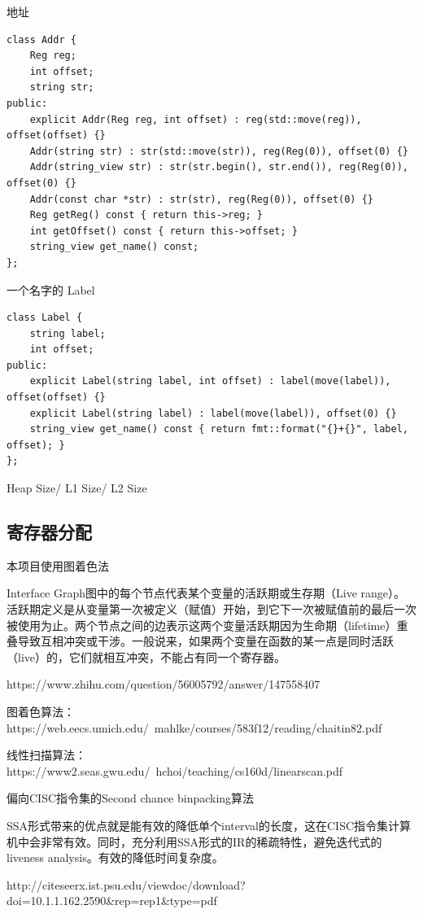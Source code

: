 \documentclass[a4paper]{exam}
\theoremstyle{definition}
\begin{document}
地址
\begin{verbatim}
class Addr {
    Reg reg;
    int offset;
    string str;
public:
    explicit Addr(Reg reg, int offset) : reg(std::move(reg)), offset(offset) {}
    Addr(string str) : str(std::move(str)), reg(Reg(0)), offset(0) {}
    Addr(string_view str) : str(str.begin(), str.end()), reg(Reg(0)), offset(0) {}
    Addr(const char *str) : str(str), reg(Reg(0)), offset(0) {}
    Reg getReg() const { return this->reg; }
    int getOffset() const { return this->offset; }
    string_view get_name() const;
};
\end{verbatim}
一个名字的 Label
\begin{verbatim}
class Label {
    string label;
    int offset;
public:
    explicit Label(string label, int offset) : label(move(label)), offset(offset) {}
    explicit Label(string label) : label(move(label)), offset(0) {}
    string_view get_name() const { return fmt::format("{}+{}", label, offset); }
};
\end{verbatim}
Heap Size/ L1 Size/ L2 Size
\subsection{寄存器分配}

本项目使用图着色法

Interface Graph图中的每个节点代表某个变量的活跃期或生存期（Live range）。活跃期定义是从变量第一次被定义（赋值）开始，到它下一次被赋值前的最后一次被使用为止。两个节点之间的边表示这两个变量活跃期因为生命期（lifetime）重叠导致互相冲突或干涉。一般说来，如果两个变量在函数的某一点是同时活跃（live）的，它们就相互冲突，不能占有同一个寄存器。

https://www.zhihu.com/question/56005792/answer/147558407

图着色算法：https://web.eecs.umich.edu/~mahlke/courses/583f12/reading/chaitin82.pdf

线性扫描算法：https://www2.seas.gwu.edu/~hchoi/teaching/cs160d/linearscan.pdf

偏向CISC指令集的Second chance binpacking算法

SSA形式带来的优点就是能有效的降低单个interval的长度，这在CISC指令集计算机中会非常有效。同时，充分利用SSA形式的IR的稀疏特性，避免迭代式的liveness analysis。有效的降低时间复杂度。

http://citeseerx.ist.psu.edu/viewdoc/download?doi=10.1.1.162.2590&rep=rep1&type=pdf

\printbibliography
\end{document}
